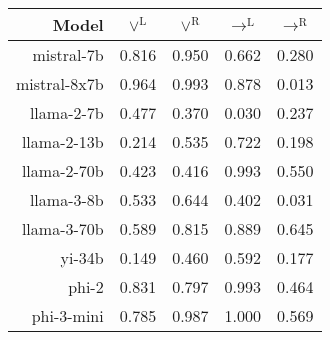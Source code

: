 \begin{tabular}{rcccc}
\toprule
Model & $\lor^\mathrm{L}$ & $\lor^\mathrm{R}$ & $\to^\mathrm{L}$ & $\to^\mathrm{R}$ \\
\midrule
mistral-7b   & 0.816 & 0.950 & 0.662 & 0.280 \\
mistral-8x7b & 0.964 & 0.993 & 0.878 & 0.013 \\
llama-2-7b   & 0.477 & 0.370 & 0.030 & 0.237 \\
llama-2-13b  & 0.214 & 0.535 & 0.722 & 0.198 \\
llama-2-70b  & 0.423 & 0.416 & 0.993 & 0.550 \\
llama-3-8b   & 0.533 & 0.644 & 0.402 & 0.031 \\
llama-3-70b  & 0.589 & 0.815 & 0.889 & 0.645 \\
yi-34b       & 0.149 & 0.460 & 0.592 & 0.177 \\
phi-2        & 0.831 & 0.797 & 0.993 & 0.464 \\
phi-3-mini   & 0.785 & 0.987 & 1.000 & 0.569 \\
\bottomrule
\end{tabular}